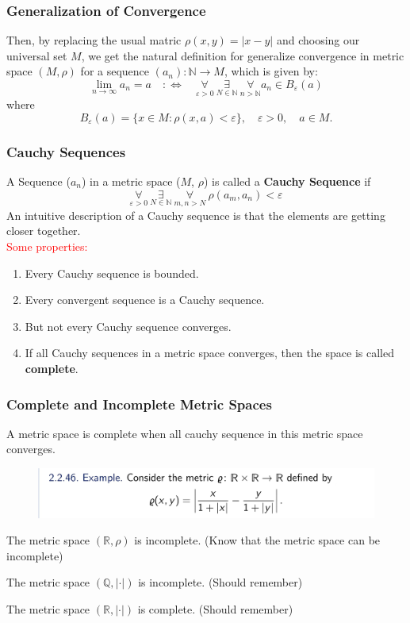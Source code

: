 \documentclass{beamer}
\begin{document}
\begin{frame}
    \frametitle{Generalization of Convergence}
    Then, by replacing the usual matric $\rho(x,y)=|x-y|$ and choosing our universal set $M$, we get the natural definition for
    generalize convergence in metric space $(M,\rho)$ for a sequence $(a_n):\mathbb{N}\rightarrow M$, which is given by:
    \begin{equation*}
        \lim_{n\rightarrow \infty}a_n=a\quad :\Leftrightarrow \quad \underset{\varepsilon>0}{\forall}\ \underset{N\in \mathbb{N}}{\exists}\ \underset{n>\mathbb{N}}{\forall} a_n\in B_\varepsilon(a)
    \end{equation*}
    where
    \begin{equation*}
        B_\varepsilon(a)=\{ x\in M:\rho(x,a)<\varepsilon\},\quad \varepsilon>0,\quad a\in M.
    \end{equation*}
\end{frame}

\begin{frame}
    \frametitle{Cauchy Sequences}
    A Sequence ($a_n$) in a metric space ($M$, $\rho$) is called a
    \textbf{Cauchy Sequence} if
    $$\underset{\varepsilon>0}{\forall} ~\underset{N \in \mathbb{N}}{\exists}~\underset{m,n>N}{\forall} ~\rho(a_m,a_n)<\varepsilon$$
    An intuitive description of a Cauchy sequence is that the elements are
    getting closer together.\\
    \vspace{1em}
    \textcolor{red}{Some properties:}
    \begin{enumerate}
        \item Every Cauchy sequence is bounded.
        \item Every convergent sequence is a Cauchy sequence.
        \item But not every Cauchy sequence converges.
        \item If all Cauchy sequences in a metric space converges,
              then the space is called \textbf{complete}.
    \end{enumerate}
\end{frame}

\begin{frame}
    \frametitle{Complete and Incomplete Metric Spaces}
    A metric space is complete when all cauchy sequence in this metric space converges.
    \begin{figure}[htbp]
        \centering
        \includegraphics[width=12cm]{complete.png}
    \end{figure}
    The metric space $(\mathbb{R},\rho)$ is incomplete. (Know that the metric space can be incomplete)

    The metric space $(\mathbb{Q},\left|\cdot\right|)$ is incomplete. (Should remember)

    The metric space $(\mathbb{R},\left|\cdot\right|)$ is complete. (Should remember)
\end{frame}
\end{document}
